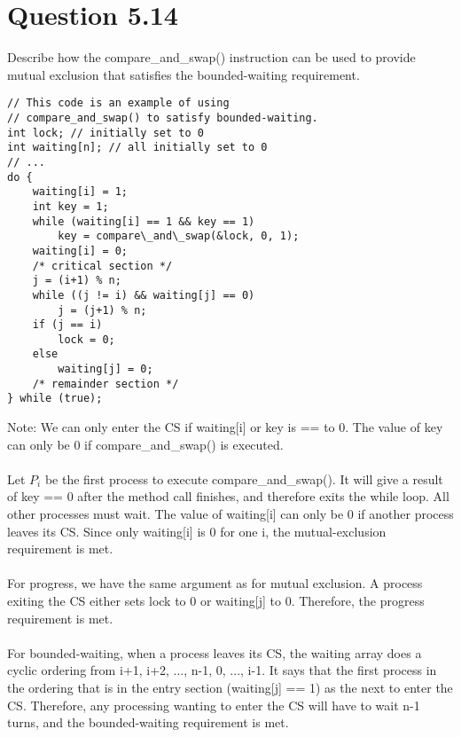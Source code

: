 \documentclass[12pt]{article}
\begin{document}
\section*{Question 5.14} {\color{blue}Describe how the compare\_and\_swap() instruction can be used to provide mutual exclusion that satisfies the bounded-waiting requirement.}
\\
\begin{lstlisting}
// This code is an example of using 
// compare_and_swap() to satisfy bounded-waiting.
int lock; // initially set to 0
int waiting[n]; // all initially set to 0
// ...
do {
	waiting[i] = 1;
	int key = 1;
	while (waiting[i] == 1 && key == 1)
		key = compare\_and\_swap(&lock, 0, 1);
	waiting[i] = 0;
	/* critical section */
	j = (i+1) % n;
	while ((j != i) && waiting[j] == 0)
		j = (j+1) % n;
	if (j == i)
		lock = 0;
	else
		waiting[j] = 0;
	/* remainder section */
} while (true);
\end{lstlisting}

\noindent Note: We can only enter the CS if waiting[i] or key is == to 0. The value of key can only be 0 if compare\_and\_swap() is executed. 
\\ \\
Let $P_{i}$ be the first process to execute compare\_and\_swap(). It will give a result of key == 0 after the method call finishes, and therefore exits the while loop. All other processes must wait. The value of waiting[i] can only be 0 if another process leaves its CS. Since only waiting[i] is 0 for one i, the mutual-exclusion requirement is met.
\\ \\
For progress, we have the same argument as for mutual exclusion. A process exiting the CS either sets lock to 0 or waiting[j] to 0. Therefore, the progress requirement is met.
\\ \\
For bounded-waiting, when a process leaves its CS, the waiting array does a cyclic ordering from i+1, i+2, ..., n-1, 0, ..., i-1. It says that the first process in the ordering that is in the entry section (waiting[j] == 1) as the next to enter the CS. Therefore, any processing wanting to enter the CS will have to wait n-1 turns, and the bounded-waiting requirement is met. 
\end{document}
